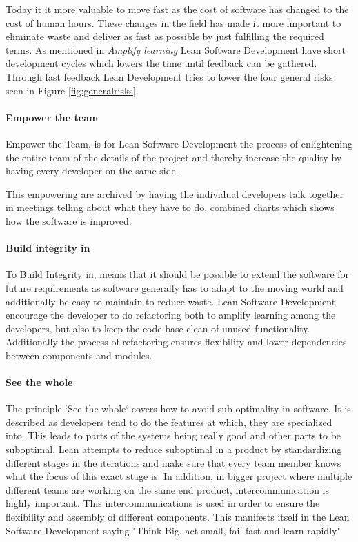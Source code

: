 \documentclass{sig-alternate}
\begin{document}
Today it it more valuable to move fast as the cost of software has changed to the cost of human hours. 
These changes in the field has made it more important to eliminate waste and deliver as fast as possible 
by just fulfilling the required terms.
As mentioned in \textit{Amplify learning} Lean Software Development have short development cycles which 
lowers the time until feedback can be gathered. Through fast feedback Lean Development tries to lower 
the four general risks seen in Figure \ref{fig:generalrisks}.

\paragraph{Empower the team}
Empower the Team, is for Lean Software Development the process of enlightening the entire team of the 
details of the project and thereby increase the quality by having every developer on the same side. 

This empowering are archived by having the individual developers talk together in meetings telling
about what they have to do, combined charts which shows how the software is improved.

\paragraph{Build integrity in}
To Build Integrity in, means that it should be possible to extend the software for future requirements 
as software generally has to adapt to the moving world and additionally be easy to maintain to reduce waste.
Lean Software Development encourage the developer to do refactoring both to amplify learning among the 
developers, but also to keep the code base clean of unused functionality. 
Additionally the process of refactoring ensures flexibility and lower dependencies between components 
and modules.  

\paragraph{See the whole}
The principle `See the whole` covers how to avoid sub-optimality in software. 
It is described as developers tend to do the features at which, they are specialized into.
This leads to parts of the systems being really good and other parts to be suboptimal.
Lean attempts to reduce suboptimal in a product by standardizing different stages in the iterations and 
make sure that every team member knows what the focus of this exact stage is. 
In addition, in bigger project where multiple different teams are working on the same end product, 
intercommunication is highly important. 
This intercommunications is used in order to ensure the flexibility and assembly of different components. 
This manifests itself in the Lean Software Development saying "Think Big, act small, fail fast and learn rapidly" \cite{poppendieck:lean} 
\end{document}
